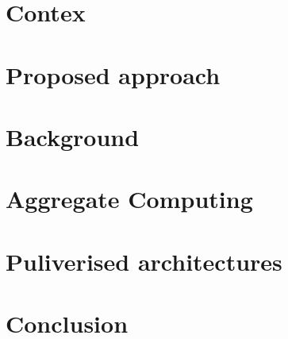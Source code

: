 \documentclass[aspectratio=169, 9pt]{beamer}
\begin{document}


\section{Contex}



\section{Proposed approach}

\section{Background}
\section{Aggregate Computing}





\section{Puliverised architectures}




\section{Conclusion}



\end{document}
